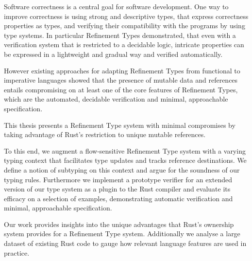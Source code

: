 
\Abstract

Software correctness is a central goal for software development.
One way to improve correctness is using strong and descriptive types, that express correctness properties as types, and verifying their compatibility with the programs by using type systems.
In particular Refinement Types demonstrated, that even with a verification system that is restricted to a decidable logic, intricate properties can be expressed in a lightweight and gradual way and verified automatically.

However existing approaches for adapting Refinement Types from functional to imperative languages showed that the presence of mutable data and references entails compromising on at least one of the core features of Refinement Types, which are the automated, decidable verification and minimal, approachable specification.

This thesis presents a Refinement Type system with minimal compromises by taking advantage of Rust's restriction to unique mutable references.


To this end, we augment a flow-sensitive Refinement Type system with a varying typing context that facilitates type updates and tracks reference destinations. We define a notion of subtyping on this context and argue for the soundness of our typing rules. 
Furthermore we implement a prototype verifier for an extended version of our type system as a plugin to the Rust compiler and evaluate its efficacy on a selection of examples, demonstrating automatic verification and minimal, approachable specification.

Our work provides insights into the unique advantages that Rust's ownership system provides for a Refinement Type system. Additionally we analyse a large dataset of existing Rust code to gauge how relevant language features are used in practice.

